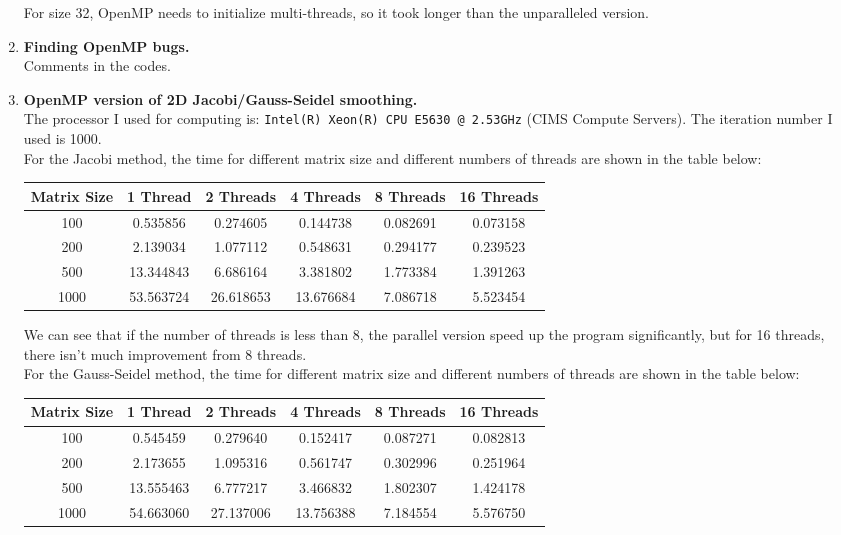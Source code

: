 \documentclass[12pt]{article}
\begin{document}
\begin{enumerate}
For size 32, OpenMP needs to initialize multi-threads, so it took longer than the unparalleled version. 

  
\item {\bf Finding OpenMP bugs.} \\
Comments in the codes.

\item {\bf OpenMP version of 2D Jacobi/Gauss-Seidel smoothing.}\\
The processor I used for computing is: \texttt{Intel(R) Xeon(R) CPU  E5630  @ 2.53GHz} (CIMS Compute Servers). The iteration number I used is 1000.\\
For the Jacobi method, the time for different matrix size and different numbers of threads are shown in the table below:
\begin{center}
\begin{tabular}{ |c|c|c|c|c|c| }
 \hline
 Matrix Size    &   1 Thread   & 2 Threads    &   4 Threads  & 8 Threads & 16 Threads\\
 \hline
         100  & 0.535856  & 0.274605 & 0.144738 & 0.082691 & 0.073158\\
         200  & 2.139034 & 1.077112 & 0.548631 & 0.294177 & 0.239523 \\
         500  & 13.344843 & 6.686164& 3.381802 & 1.773384 & 1.391263 \\
       1000  & 53.563724  & 26.618653 & 13.676684 & 7.086718 & 5.523454 \\
  \hline
\end{tabular}
\end{center}
We can see that if the number of threads is less than 8, the parallel version speed up the program significantly, but for 16 threads, there isn't much improvement from 8 threads. \\
For the Gauss-Seidel method, the time for different matrix size and different numbers of threads are shown in the table below:
\begin{center}
\begin{tabular}{ |c|c|c|c|c|c| }
 \hline
 Matrix Size & 1 Thread & 2 Threads & 4 Threads & 8 Threads & 16 Threads\\
 \hline
         100  & 0.545459  & 0.279640 & 0.152417 & 0.087271 & 0.082813\\
         200  & 2.173655 & 1.095316 & 0.561747 & 0.302996 & 0.251964 \\
         500  & 13.555463 & 6.777217 & 3.466832 & 1.802307 & 1.424178 \\
       1000  & 54.663060 & 27.137006 & 13.756388 & 7.184554 & 5.576750 \\
  \hline
\end{tabular}
\end{center}
  
  
\end{enumerate}
\end{document}
